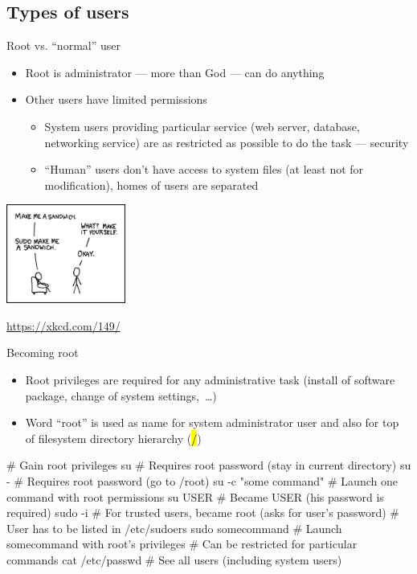 \documentclass[compress, ucs, xelatex, 11pt, xcolor=svgnames,
  hyperref={
    bookmarks=true,
    unicode=true,
    colorlinks=true,
    pdftitle={Linux, command line and MetaCentrum},
    plainpages=false,
    pdfauthor={Vojtech Zeisek},
    pdfsubject={Course about use of Linux command line, writing shell scripts and using MetaCentrum of CESNET},
    pdfcreator={XeLaTeX},
    pdfkeywords={Linux, GNU, BASH, shell, command line, MetaCentrum},
    linkcolor=DarkRed,
    anchorcolor=DarkBlue,
    citecolor=Indigo,
    filecolor=NavyBlue,
    menucolor=DarkMagenta,
    urlcolor=DarkBlue,
    pdftex},
  url={hyphens, lowtilde} %
  ]{beamer}
\renewcommand{\texttt}[1]{\hl{\ttfamily #1}}
\begin{document}
\subsection{Types of users}

\begin{frame}{Root vs. ``normal'' user}
  \label{root}
  \begin{itemize}
    \item Root is administrator --- more than God --- can do anything
    \item Other users have limited permissions
    \begin{itemize}
      \item System users providing particular service (web server, database, networking service) are as restricted as possible to do the task --- security
      \item ``Human'' users don't have access to system files (at least not for modification), homes of users are separated
    \end{itemize}
  \end{itemize}
  \begin{center}
    \includegraphics[height=3.25cm]{sandwich.png}
  \end{center}
  \begin{flushright}
    \url{https://xkcd.com/149/}
  \end{flushright}
\end{frame}

\begin{frame}[fragile]{Becoming root}
  \begin{itemize}
    \item Root privileges are required for any administrative task (install of software package, change of system settings,~\ldots)
    \item Word ``root'' is used as name for system administrator user and also for top of filesystem directory hierarchy (\texttt{/})
  \end{itemize}
  \begin{bashcode}
    # Gain root privileges
    su # Requires root password (stay in current directory)
    su - # Requires root password (go to /root)
    su -c "some command" # Launch one command with root permissions
    su USER # Became USER (his password is required)
    sudo -i # For trusted users, became root (asks for user's password)
            # User has to be listed in /etc/sudoers
    sudo somecommand # Launch somecommand with root's privileges
                     # Can be restricted for particular commands
    cat /etc/passwd # See all users (including system users)
  \end{bashcode}
\end{frame}
\end{document}
